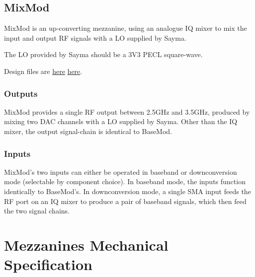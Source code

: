 \subsection{MixMod}\label{mixmod}

MixMod is an up-converting mezzanine, using an analogue IQ mixer to mix
the input and output RF signals with a LO supplied by Sayma.

The LO provided by Sayma should be a 3V3 PECL square-wave.

Design files are
\href{https://github.com/m-labs/sinara/tree/master/ARTIQ_ALTIUM/Sayma_AFEs/MixMod}{here}
\href{https://github.com/m-labs/sinara/tree/master/ARTIQ_ALTIUM/Sayma_AFEs/BaseMod}{here}.

\subsubsection{Outputs}\label{outputs-1}

MixMod provides a single RF output between 2.5GHz and 3.5GHz, produced
by mixing two DAC channels with a LO supplied by Sayma. Other than the
IQ mixer, the output signal-chain is identical to BaseMod.

\subsubsection{Inputs}\label{inputs-1}

MixMod's two inputs can either be operated in baseband or downconversion
mode (selectable by component choice). In baseband mode, the inputs
function identically to BaseMod's. In downconversion mode, a single SMA
input feeds the RF port on an IQ mixer to produce a pair of baseband
signals, which then feed the two signal chains.

\section{Mezzanines Mechanical Specification}\label{general-specification}


